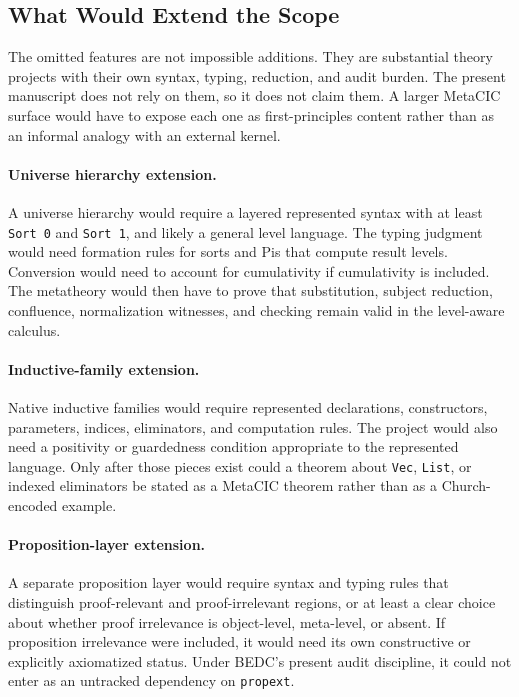 \subsection{What Would Extend the Scope}
\label{subsec:metacic-extend-scope}

The omitted features are not impossible additions.  They are substantial
theory projects with their own syntax, typing, reduction, and audit burden.
The present manuscript does not rely on them, so it does not claim them.  A
larger MetaCIC surface would have to expose each one as first-principles
content rather than as an informal analogy with an external kernel.

\paragraph{Universe hierarchy extension.}
A universe hierarchy would require a layered represented syntax with at
least \texttt{Sort 0} and \texttt{Sort 1}, and likely a general level
language.  The typing judgment would need formation rules for sorts and Pis
that compute result levels.  Conversion would need to account for
cumulativity if cumulativity is included.  The metatheory would then have to
prove that substitution, subject reduction, confluence, normalization
witnesses, and checking remain valid in the level-aware calculus.

\paragraph{Inductive-family extension.}
Native inductive families would require represented declarations,
constructors, parameters, indices, eliminators, and computation rules.  The
project would also need a positivity or guardedness condition appropriate to
the represented language.  Only after those pieces exist could a theorem
about \texttt{Vec}, \texttt{List}, or indexed eliminators be stated as a
MetaCIC theorem rather than as a Church-encoded example.

\paragraph{Proposition-layer extension.}
A separate proposition layer would require syntax and typing rules that
distinguish proof-relevant and proof-irrelevant regions, or at least a clear
choice about whether proof irrelevance is object-level, meta-level, or absent.
If proposition irrelevance were included, it would need its own constructive
or explicitly axiomatized status.  Under BEDC's present audit discipline, it
could not enter as an untracked dependency on \texttt{propext}.

